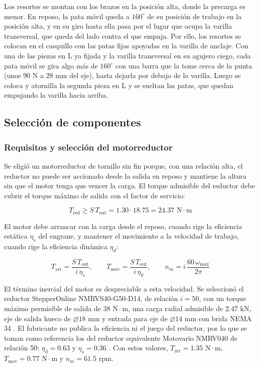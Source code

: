 \documentclass[../../General.tex]{subfiles}
\begin{document}
Los resortes se montan con los brazos en la posición alta, donde la precarga es menor. En reposo, la pata móvil queda a $160^\circ$ de su posición de trabajo en la posición alta, y en su giro hasta ella pasa por el lugar que ocupa la varilla transversal, que queda del lado contra el que empuja. Por ello, los resortes se colocan en el casquillo con las patas fijas apoyadas en la varilla de anclaje. Con una de las piezas en L ya fijada y la varilla transversal en su agujero ciego, cada pata móvil se gira algo más de $160^\circ$ con una barra que la tome cerca de la punta (unos $90\text{ N}$ a $28\text{ mm}$ del eje), hasta dejarla por debajo de la varilla. Luego se coloca y atornilla la segunda pieza en L y se sueltan las patas, que quedan empujando la varilla hacia arriba.

\subsection{Selección de componentes}\label{subsec:actuador_elev}

\subsubsection{Requisitos y selección del motorreductor}

Se eligió un motorreductor de tornillo sin fin porque, con una relación alta, el reductor no puede ser accionado desde la salida en reposo y mantiene la altura sin que el motor tenga que vencer la carga. El torque admisible del reductor debe cubrir el torque máximo de salida con el factor de servicio:

\begin{equation}\label{eq:Tred_elev}
    T_{\text{red}} \geq S\,T_{\text{out}} = 1.30 \cdot 18.75 = 24.37\text{ N}\cdot\text{m}
\end{equation}

El motor debe arrancar con la carga desde el reposo, cuando rige la eficiencia estática $\eta_s$ del engrane, y mantener el movimiento a la velocidad de trabajo, cuando rige la eficiencia dinámica $\eta_d$:

\begin{equation}\label{eq:Tmotor_elev}
    T_{\text{arr}} = \frac{S\,T_{\text{out}}}{i\,\eta_s}, \qquad T_{\text{mov}} = \frac{S\,T_{\text{out}}}{i\,\eta_d}, \qquad n_m = i\,\frac{60\,\omega_{\text{máx}}}{2\pi}
\end{equation}

El término inercial del motor es despreciable a esta velocidad. Se seleccionó el reductor StepperOnline NMRVS40-G50-D14, de relación $i = 50$, con un torque máximo permisible de salida de $38\text{ N}\cdot\text{m}$, una carga radial admisible de $2.47\text{ kN}$, eje de salida hueco de $\varnothing 18\text{ mm}$ y entrada para eje de $\varnothing 14\text{ mm}$ con brida NEMA 34 \citep{stepperonline_nmrvs40}. El fabricante no publica la eficiencia ni el juego del reductor, por lo que se toman como referencia los del reductor equivalente Motovario NMRV040 de relación 50: $\eta_d = 0.63$ y $\eta_s = 0.36$ \citep{motovario_vsf}. Con estos valores, $T_{\text{arr}} = 1.35\text{ N}\cdot\text{m}$, $T_{\text{mov}} = 0.77\text{ N}\cdot\text{m}$ y $n_m = 61.5\text{ rpm}$.
\end{document}
